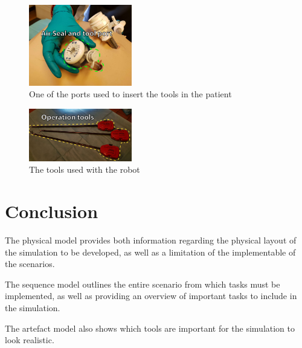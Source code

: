 \begin{figure}[hbpt]
	\centering
	\includegraphics[width=0.4\textwidth]{OperationRoom/port}
	\caption{One of the ports used to insert the tools in the patient}
	\label{fig:port}
\end{figure}

\begin{figure}[hbpt]
	\centering
	\includegraphics[width=0.4\textwidth]{OperationRoom/tools}
	\caption{The tools used with the robot}
	\label{fig:tools}
\end{figure}

\section*{Conclusion}
The physical model provides both information regarding the physical layout of the simulation to be developed, as well as a limitation of the implementable of the scenarios. 

The sequence model outlines the entire scenario from which tasks must be implemented, as well as providing an overview of important tasks to include in the simulation.

The artefact model also shows which tools are important for the simulation to look realistic.

\newpage

\appendix %
